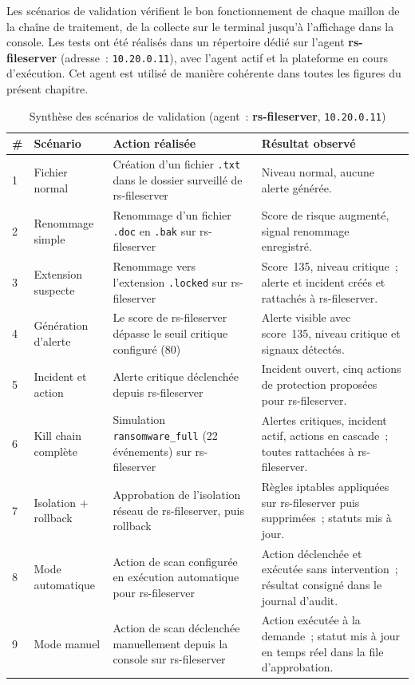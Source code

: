 Les scénarios de validation vérifient le bon fonctionnement de chaque maillon de la chaîne de traitement, de la collecte sur le terminal jusqu'à l'affichage dans la console. Les tests ont été réalisés dans un répertoire dédié sur l'agent \textbf{rs-fileserver} (adresse~: \texttt{10.20.0.11}), avec l'agent actif et la plateforme en cours d'exécution. Cet agent est utilisé de manière cohérente dans toutes les figures du présent chapitre.

\begin{table}[htbp]
\centering
\caption{Synthèse des scénarios de validation (agent~: \textbf{rs-fileserver}, \texttt{10.20.0.11})}
\label{tab:scenarios-validation}
\small
\renewcommand{\arraystretch}{1.35}
\begin{tabularx}{\textwidth}{|p{0.4cm}|p{3.5cm}|p{4.2cm}|X|}
\hline
\textbf{\#} & \textbf{Scénario} & \textbf{Action réalisée} & \textbf{Résultat observé} \\
\hline
1 & Fichier normal & Création d'un fichier \texttt{.txt} dans le dossier surveillé de rs-fileserver & Niveau normal, aucune alerte générée. \\
\hline
2 & Renommage simple & Renommage d'un fichier \texttt{.doc} en \texttt{.bak} sur rs-fileserver & Score de risque augmenté, signal renommage enregistré. \\
\hline
3 & Extension suspecte & Renommage vers l'extension \texttt{.locked} sur rs-fileserver & Score~135, niveau critique~; alerte et incident créés et rattachés à rs-fileserver. \\
\hline
4 & Génération d'alerte & Le score de rs-fileserver dépasse le seuil critique configuré (80) & Alerte visible avec score~135, niveau critique et signaux détectés. \\
\hline
5 & Incident et action & Alerte critique déclenchée depuis rs-fileserver & Incident ouvert, cinq actions de protection proposées pour rs-fileserver. \\
\hline
6 & Kill chain complète & Simulation \texttt{ransomware\_full} (22 événements) sur rs-fileserver & Alertes critiques, incident actif, actions en cascade~; toutes rattachées à rs-fileserver. \\
\hline
7 & Isolation + rollback & Approbation de l'isolation réseau de rs-fileserver, puis rollback & Règles iptables appliquées sur rs-fileserver puis supprimées~; statuts mis à jour. \\
\hline
8 & Mode automatique & Action de scan configurée en exécution automatique pour rs-fileserver & Action déclenchée et exécutée sans intervention~; résultat consigné dans le journal d'audit. \\
\hline
9 & Mode manuel & Action de scan déclenchée manuellement depuis la console sur rs-fileserver & Action exécutée à la demande~; statut mis à jour en temps réel dans la file d'approbation. \\
\hline
\end{tabularx}
\end{table}

